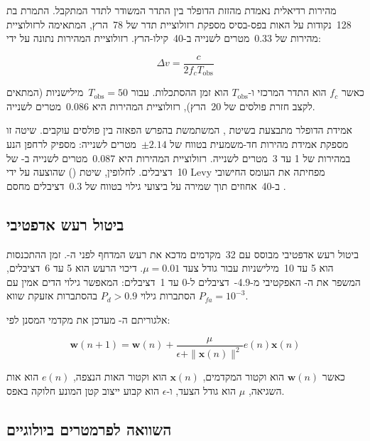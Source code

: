 מהירות רדיאלית נאמדת מהזזת הדופלר בין התדר המשודר לתדר המתקבל. התמרת  בת 128~נקודות על האות בפס-בסיס מספקת רזולוציית תדר של 78~הרץ, המתאימה לרזולוציית מהירות של 0.33~מטרים לשנייה ב-40~קילו-הרץ. רזולוציית המהירות נתונה על ידי:

\begin{equation}
\Delta v = \frac{c}{2 f_c T_{\text{obs}}}
\label{eq:ch03_vel_res}
\end{equation}

כאשר $f_c$ הוא התדר המרכזי ו-$T_{\text{obs}}$ הוא זמן ההסתכלות. עבור $T_{\text{obs}} = 50$~מילישניות (המתאים לקצב חזרת פולסים של 20~הרץ), רזולוציית המהירות היא 0.086~מטרים לשנייה.

אמידת הדופלר מתבצעת בשיטת , המשתמשת בהפרש הפאזה בין פולסים עוקבים. שיטה זו מספקת אמידת מהירות חד-משמעית בטווח של $\pm2.14$~מטרים לשנייה: מספיק לרחפן הנע במהירות של 1 עד 3~מטרים לשנייה. רזולוציית המהירות היא 0.087~מטרים לשנייה ב- של 10~דציבלים. לחלופין, שיטת  () שהוצעה על ידי Levy \cite{Rihaczek1969MatchedFilter} מפחיתה את העומס החישובי ב-40~אחוזים תוך שמירה על ביצועי גילוי בטווח של 0.3~דציבלים מחסם .

\subsection{ביטול רעש אדפטיבי}
\label{sec:noise_cancellation}

ביטול רעש אדפטיבי מבוסס  עם 32~מקדמים מדכא את רעש המדחף לפני ה-. זמן ההתכנסות הוא 5 עד 10~מילישניות עבור גודל צעד $\mu = 0.01$. דיכוי הרעש הוא 5 עד 6~דציבלים, המשפר את ה- האפקטיבי מ-4.9-~דציבלים ל-0 עד 1~דציבלים: המאפשר גילוי הדים אמין עם הסתברות גילוי $P_d > 0.9$ בהסתברות אזעקת שווא $P_{fa} = 10^{-3}$.

אלגוריתם ה- מעדכן את מקדמי המסנן לפי:

\begin{equation}
\mathbf{w}(n+1) = \mathbf{w}(n) + \frac{\mu}{\epsilon + \|\mathbf{x}(n)\|^2} e(n) \mathbf{x}(n)
\label{eq:ch03_nlms}
\end{equation}

כאשר $\mathbf{w}(n)$ הוא וקטור המקדמים, $\mathbf{x}(n)$ הוא וקטור האות הנצפה, $e(n)$ הוא אות השגיאה, $\mu$ הוא גודל הצעד, ו-$\epsilon$ הוא קבוע ייצוב קטן המונע חלוקה באפס.

\subsection{השוואה לפרמטרים ביולוגיים}
\label{sec:bio_comparison}

